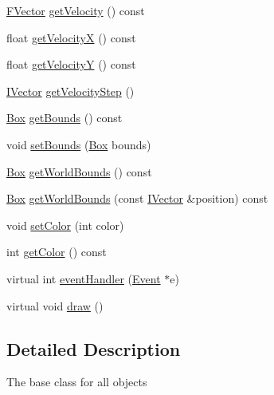 \begin{DoxyCompactItemize}
\hyperlink{class_f_vector}{F\+Vector} \hyperlink{class_object_a4f1958fae32120d02efcecd7b1beab0a}{get\+Velocity} () const 
\item 
float \hyperlink{class_object_a38db2c22257704f142a381489a14fab7}{get\+Velocity\+X} () const 
\item 
float \hyperlink{class_object_abaa3cb97d49316883310e039de172dd4}{get\+Velocity\+Y} () const 
\item 
\hyperlink{class_i_vector}{I\+Vector} \hyperlink{class_object_a3589d53e0f2594f92b946b1b40a07c75}{get\+Velocity\+Step} ()
\item 
\hyperlink{class_box}{Box} \hyperlink{class_object_a75472ab21010cf9c8da2046076ec09e1}{get\+Bounds} () const 
\item 
void \hyperlink{class_object_a2ee8e04108059dc5ca44ef6bfdc8543f}{set\+Bounds} (\hyperlink{class_box}{Box} bounds)
\item 
\hyperlink{class_box}{Box} \hyperlink{class_object_abc47b6c91a4ea3605c00039c5c8ba0f3}{get\+World\+Bounds} () const 
\item 
\hyperlink{class_box}{Box} \hyperlink{class_object_a478c8650ee8250fc9d44c0a6e8b6c5f2}{get\+World\+Bounds} (const \hyperlink{class_i_vector}{I\+Vector} \&position) const 
\item 
void \hyperlink{class_object_a937aa61549bbcea2c02f43ae24cd73ef}{set\+Color} (int color)
\item 
int \hyperlink{class_object_ae5e6499a684d0e46c2609b219650e598}{get\+Color} () const 
\item 
virtual int \hyperlink{class_object_aef5d6ac71c5184a72e7101584d377998}{event\+Handler} (\hyperlink{class_event}{Event} $\ast$e)
\item 
virtual void \hyperlink{class_object_a821f5b25b450fa1acdb3f9c0b5962592}{draw} ()
\end{DoxyCompactItemize}


\subsection{Detailed Description}
The base class for all objects 

